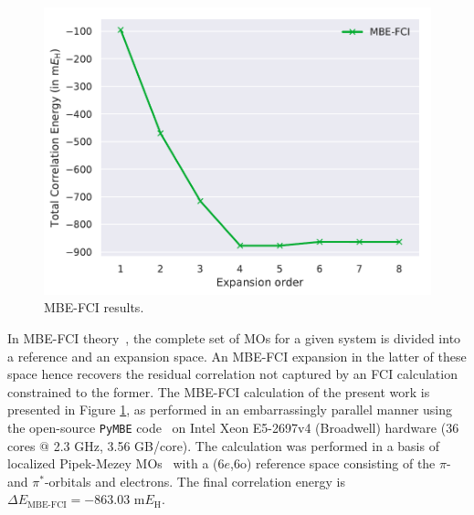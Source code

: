\documentclass[journal=jcp,manuscript=suppinfo]{achemso}
\begin{document}
%
\begin{figure}[ht!]
\begin{center}
\includegraphics[scale=0.75]{figures/mbe_fci/mbe_fci.pdf}
\caption{MBE-FCI results.}
\label{mbe_fci_SI_fig}
\end{center}
\vspace{-0.6cm}
\end{figure}
%
In MBE-FCI theory~\cite{eriksen_mbe_fci_jpcl_2017,eriksen_mbe_fci_weak_corr_jctc_2018,eriksen_mbe_fci_strong_corr_jctc_2019,eriksen_mbe_fci_general_jpcl_2019}, the complete set of MOs for a given system is divided into a reference and an expansion space. An MBE-FCI expansion in the latter of these space hence recovers the residual correlation not captured by an FCI calculation constrained to the former. The MBE-FCI calculation of the present work is presented in Figure \ref{mbe_fci_SI_fig}, as performed in an embarrassingly parallel manner using the open-source {\texttt{PyMBE}} code~\cite{pymbe} on Intel Xeon E5-2697v4 (Broadwell) hardware (36 cores $@$ 2.3 GHz, 3.56 GB/core). The calculation was performed in a basis of localized Pipek-Mezey MOs~\cite{pipek_mezey_jcp_1989} with a ($6e$,$6$o) reference space consisting of the $\pi$- and $\pi^{\ast}$-orbitals and electrons. The final correlation energy is $\Delta E_{\text{MBE-FCI}} = -863.03$ m$E_{\text{H}}$.\\
\end{document}

